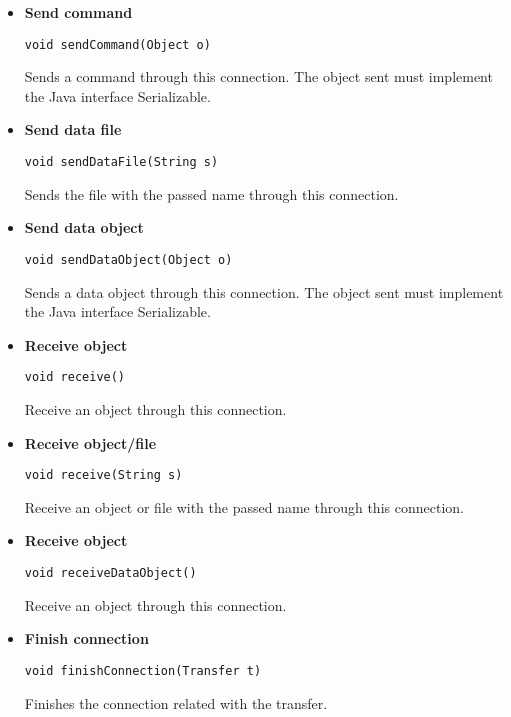 \documentclass[10pt]{article}
\begin{document}
\begin{itemize}

	\item \textbf{Send command}
	\begin{lstlisting}
void sendCommand(Object o)
	\end{lstlisting}
	Sends a command through this connection. The object sent must implement the Java interface Serializable.
	
	\item \textbf{Send data file}
	\begin{lstlisting}
void sendDataFile(String s)
	\end{lstlisting}
	Sends the file with the passed name through this connection.
	
	\item \textbf{Send data object}
	\begin{lstlisting}
void sendDataObject(Object o)
	\end{lstlisting}
	Sends a data object through this connection. The object sent must implement the Java interface Serializable.
	
	\item \textbf{Receive object}
	\begin{lstlisting}
void receive()
	\end{lstlisting}
	Receive an object through this connection.
	
	\item \textbf{Receive object/file}
	\begin{lstlisting}
void receive(String s)
	\end{lstlisting}
	Receive an object or file with the passed name through this connection.
	
	\item \textbf{Receive object}
	\begin{lstlisting}
void receiveDataObject()
	\end{lstlisting}
	Receive an object through this connection.
	
	\item \textbf{Finish connection}
	\begin{lstlisting}
void finishConnection(Transfer t)
	\end{lstlisting}
	Finishes the connection related with the transfer.
\end{itemize}
\end{document}
